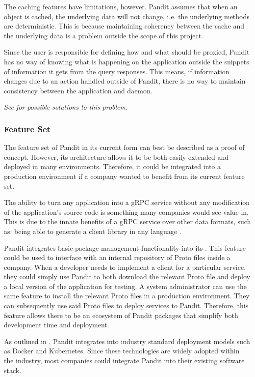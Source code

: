 \documentclass[a4paper,12pt]{report}
\begin{document}
The caching features have limitations, however. Pandit assumes that when an object is cached, the underlying data will not change, i.e. the underlying methods are deterministic. This is because maintaining coherency between the cache and the underlying data is a problem outside the scope of this project.

Since the user is responsible for defining how and what should be proxied, Pandit has no way of knowing what is happening on the application outside the snippets of information it gets from the query responses. 
This means, if information changes due to an action handled outside of Pandit, there is no way to maintain consistency between the application and daemon.

\textit{See  for possible solutions to this problem.}

\subsubsection{Feature Set}
The feature set of Pandit in its current form can best be described as a proof of concept.
However, its architecture allows it to be both easily extended and deployed in many environments.
Therefore, it could be integrated into a production environment if a company wanted to benefit from its current feature set.

The ability to turn any application into a gRPC service without any modification of the application's source code is something many companies would see value in.
This is due to the innate benefits of a gRPC service over other data formats, such as:
being able to generate a client library in any language \cite{codegen}. 

Pandit integrates basic package management functionality into its . 
This feature could be used to interface with an internal repository of Proto files inside a company.
When a developer needs to implement a client for a particular service, they could simply use Pandit to both download the relevant Proto file 
and deploy a local version of the application for testing.
A system administrator can use the same feature to install the relevant Proto files in a production environment. 
They can subsequently use said Proto files to deploy services to Pandit.
Therefore, this feature allows there to be an ecosystem of Pandit packages that simplify both development time and deployment.

As outlined in , Pandit integrates into industry standard deployment models such as Docker and Kubernetes. 
Since these technologies are widely adopted within the industry, most companies could integrate Pandit into their existing software stack.
\end{document}

